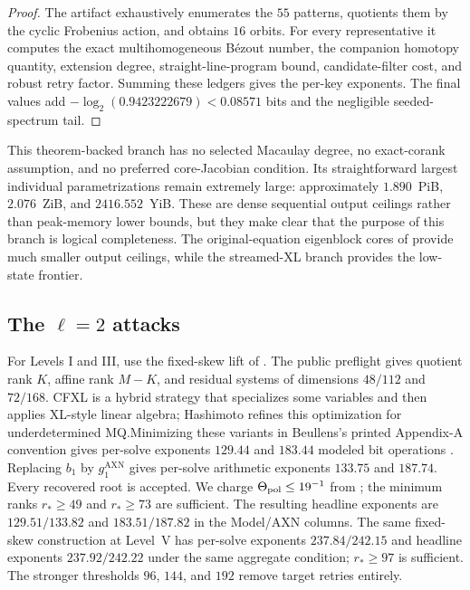 \documentclass[11pt]{article}
\begin{document}
\begin{proof}
The artifact exhaustively enumerates the $55$ patterns, quotients them by the
cyclic Frobenius action, and obtains $16$ orbits.  For every representative it
computes the exact multihomogeneous B\'ezout number, the companion homotopy
quantity, extension degree, straight-line-program bound, candidate-filter
cost, and robust retry factor.  Summing these ledgers gives the per-key
exponents.  The final values add
$-\log_2(0.9423222679)<0.08571$ bits and the negligible seeded-spectrum tail.
\end{proof}

This theorem-backed branch has no selected Macaulay degree, no exact-corank
assumption, and no preferred core-Jacobian condition.  Its straightforward
largest individual parametrizations remain extremely large: approximately
$1.890$~PiB, $2.076$~ZiB, and $2416.552$~YiB.  These are dense sequential
output ceilings rather than peak-memory lower bounds, but they make clear that
the purpose of this branch is logical completeness.  The original-equation
eigenblock cores of  provide much smaller
output ceilings, while the streamed-XL branch provides the low-state frontier.

\subsection{The \texorpdfstring{$\ell=2$}{l=2} attacks}

For Levels I and III, use the fixed-skew lift of .  The
public preflight gives quotient rank $K$, affine rank $M-K$, and residual
systems of dimensions $48/112$ and $72/168$.  CFXL is a hybrid strategy
that specializes some variables and then applies XL-style linear algebra;
Hashimoto refines this optimization for underdetermined MQ.\@  Minimizing these
variants in Beullens's printed Appendix-A convention gives per-solve
exponents $129.44$ and $183.44$ modeled bit operations
\cite{Beullens2024SNOVA,Hashimoto2023}.  Replacing $b_1$ by
$g_1^{\mathrm{AXN}}$ gives per-solve arithmetic exponents $133.75$ and
$187.74$.  Every recovered root is accepted.  We charge
$\Theta_{\rm pol}\le19^{-1}$ from ; the
minimum ranks $r_*\ge49$ and $r_*\ge73$ are sufficient.  The resulting
headline exponents are $129.51/133.82$ and $183.51/187.82$ in the Model/AXN
columns.  The same fixed-skew construction at Level~V has per-solve exponents
$237.84/242.15$ and headline exponents $237.92/242.22$ under the same aggregate condition; $r_*\ge97$ is sufficient.
The stronger thresholds $96$, $144$, and $192$ remove target retries entirely.
\end{document}
